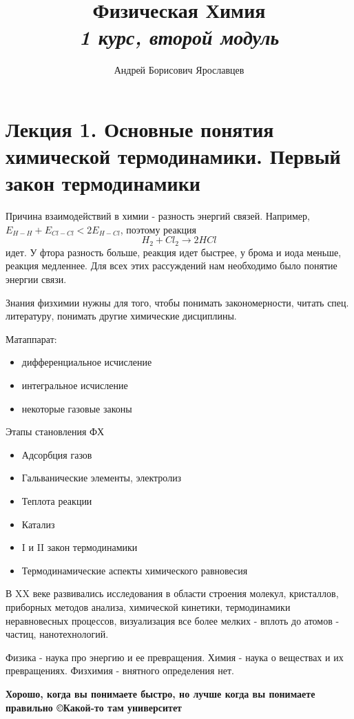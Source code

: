 \documentclass[11pt]{article}
\title{Физическая Химия\\\emph{1 курс, второй модуль}}
\author{Андрей  Борисович Ярославцев}
\date{}
\begin{document}
\begin{titlepage}
\maketitle
\end{titlepage}
\tableofcontents
\section{Лекция 1. Основные понятия химической термодинамики. Первый закон термодинамики}

Причина взаимодействий в химии - разность энергий связей. Например, $E_{H-H} + E_{Cl-Cl} < 2E_{H-Cl}$, поэтому реакция $$H_2 + Cl_2 \rightarrow 2HCl$$ идет. У фтора разность больше, реакция идет быстрее, у брома и иода меньше, реакция медленнее. Для всех этих рассуждений нам необходимо было понятие энергии связи.

Знания физхимии нужны для того, чтобы понимать закономерности, читать спец. литературу, понимать другие химические дисциплины.

Матаппарат: 
\begin{itemize}
\item дифференциальное исчисление
\item интегральное исчисление
\item некоторые газовые законы
\end{itemize}

Этапы становления ФХ

\begin{itemize}
\item Адсорбция газов
\item Гальванические элементы, электролиз
\item Теплота реакции
\item Катализ
\item I и II закон термодинамики
\item Термодинамические аспекты химического равновесия
\end{itemize}

В XX веке развивались исследования в области строения молекул, кристаллов, приборных методов анализа, химической кинетики, термодинамики неравновесных  процессов, визуализация все более мелких - вплоть до атомов - частиц, нанотехнологий. 

Физика - наука про энергию  и ее превращения. Химия - наука о веществах и их превращениях. Физхимия - внятного определения нет.

\textbf{Хорошо, когда вы понимаете быстро, но лучше когда вы понимаете правильно \copyright Какой-то там университет}
\end{document}
